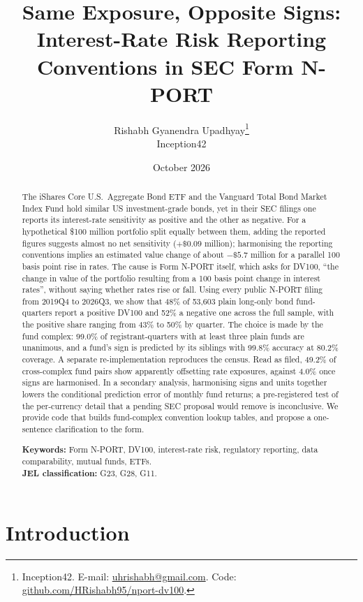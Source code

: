 \documentclass[11pt]{article}
\title{\textbf{Same Exposure, Opposite Signs:}\\[2pt]
\Large Interest-Rate Risk Reporting Conventions in SEC Form N-PORT}
\author{Rishabh Gyanendra Upadhyay\thanks{Inception42. E-mail: \href{mailto:uhrishabh@gmail.com}{uhrishabh@gmail.com}.
Code: \href{https://github.com/HRishabh95/nport-dv100}{github.com/HRishabh95/nport-dv100}.}\\[2pt] \normalsize Inception42}
\date{October 2026}
\begin{document}
\maketitle
\thispagestyle{empty}

\begin{abstract}
\noindent The iShares Core U.S.\ Aggregate Bond ETF and the Vanguard Total Bond Market Index Fund hold
similar US investment-grade bonds, yet in their SEC filings one reports its interest-rate sensitivity
as positive and the other as negative. For a hypothetical \$100 million portfolio split equally
between them, adding the reported figures suggests almost no net sensitivity ($+\$0.09$ million);
harmonising the reporting conventions implies an estimated value change of about $-\$5.7$ million for
a parallel 100 basis point rise in rates. The cause is Form N-PORT itself, which asks for DV100, ``the
change in value of the portfolio resulting from a 100 basis point change in interest rates'', without
saying whether rates rise or fall. Using every public N-PORT filing from 2019Q4 to 2026Q3, we show
that 48\% of 53,603 plain long-only bond fund-quarters report a positive DV100 and 52\% a negative one across the full sample, with the positive share ranging from 43\% to 50\% by quarter. The choice is made by the fund complex: 99.0\% of registrant-quarters with at
least three plain funds are unanimous, and a fund's sign is predicted by its siblings with 99.8\%
accuracy at 80.2\% coverage. A separate re-implementation reproduces the census. Read as filed,
49.2\% of cross-complex fund pairs show apparently offsetting rate exposures, against 4.0\% once signs
are harmonised. In a secondary analysis, harmonising signs and units together lowers the conditional prediction error of monthly fund returns; a pre-registered test of the per-currency detail that a pending SEC proposal would remove is inconclusive. We provide code that
builds fund-complex convention lookup tables, and propose a one-sentence clarification to the form.

\medskip\noindent\textbf{Keywords:} Form N-PORT, DV100, interest-rate risk, regulatory reporting,
data comparability, mutual funds, ETFs.\\
\textbf{JEL classification:} G23, G28, G11.

\end{abstract}

\newpage
\setcounter{page}{1}

\section{Introduction}
\end{document}
